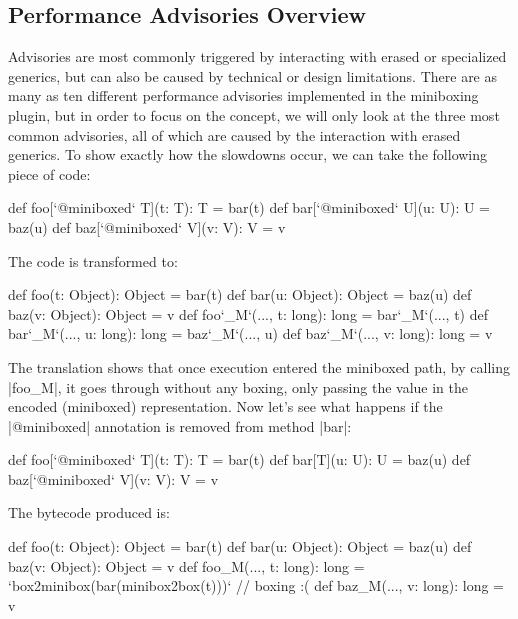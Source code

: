 \subsection{Performance Advisories Overview}

Advisories are most commonly triggered by interacting with erased or specialized generics, but can also be caused by technical or design limitations. There are as many as ten different performance advisories implemented in the miniboxing plugin, but in order to focus on the concept, we will only look at the three most common advisories, all of which are caused by the interaction with erased generics. To show exactly how the slowdowns occur, we can take the following piece of code:

\begin{lstlisting-nobreak}
 def foo[`@miniboxed` T](t: T): T = bar(t)
 def bar[`@miniboxed` U](u: U): U = baz(u)
 def baz[`@miniboxed` V](v: V): V = v
\end{lstlisting-nobreak}

The code is transformed to:

\begin{lstlisting-nobreak}
 def foo(t: Object): Object = bar(t)
 def bar(u: Object): Object = baz(u)
 def baz(v: Object): Object = v
 def foo`_M`(..., t: long): long = bar`_M`(..., t)
 def bar`_M`(..., u: long): long = baz`_M`(..., u)
 def baz`_M`(..., v: long): long = v
\end{lstlisting-nobreak}

The translation shows that once execution entered the miniboxed path, by calling |foo_M|, it goes through without any boxing, only passing the value in the encoded (miniboxed) representation. Now let's see what happens if the |@miniboxed| annotation is removed from method |bar|:

\begin{lstlisting-nobreak}
 def foo[`@miniboxed` T](t: T): T = bar(t)
 def bar[T](u: U): U = baz(u)
 def baz[`@miniboxed` V](v: V): V = v
\end{lstlisting-nobreak}

The bytecode produced is:

\begin{lstlisting-nobreak}
 def foo(t: Object): Object = bar(t)
 def bar(u: Object): Object = baz(u)
 def baz(v: Object): Object = v
 def foo_M(..., t: long): long = `box2minibox(bar(minibox2box(t)))` // boxing :(
 def baz_M(..., v: long): long = v
\end{lstlisting-nobreak}

